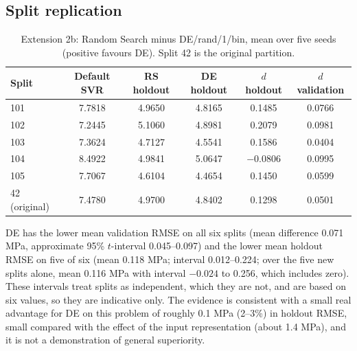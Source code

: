 \subsection{Split replication}
\begin{table}[htbp]\centering\footnotesize\caption{Extension 2b: Random Search minus DE/rand/1/bin, mean over five seeds (positive favours DE). Split 42 is the original partition.}\label{tab:ext2rep}
\begin{tabular}{lccccc}\toprule
Split & Default SVR & RS holdout & DE holdout & $d$ holdout & $d$ validation\\\midrule
101 & 7.7818 & 4.9650 & 4.8165 & 0.1485 & 0.0766\\
102 & 7.2445 & 5.1060 & 4.8981 & 0.2079 & 0.0981\\
103 & 7.3624 & 4.7127 & 4.5541 & 0.1586 & 0.0404\\
104 & 8.4922 & 4.9841 & 5.0647 & $-0.0806$ & 0.0995\\
105 & 7.7067 & 4.6104 & 4.4654 & 0.1450 & 0.0599\\
42 (original) & 7.4780 & 4.9700 & 4.8402 & 0.1298 & 0.0501\\\bottomrule
\end{tabular}\end{table}
DE has the lower mean validation RMSE on all six splits (mean difference 0.071 MPa, approximate 95\% $t$-interval 0.045--0.097) and the lower mean holdout RMSE on five of six (mean 0.118 MPa; interval 0.012--0.224; over the five new splits alone, mean 0.116 MPa with interval $-0.024$ to 0.256, which includes zero). These intervals treat splits as independent, which they are not, and are based on six values, so they are indicative only. The evidence is consistent with a small real advantage for DE on this problem of roughly 0.1 MPa (2--3\%) in holdout RMSE, small compared with the effect of the input representation (about 1.4 MPa), and it is not a demonstration of general superiority.
